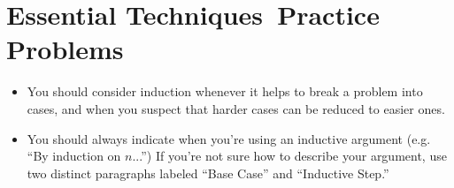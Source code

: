 \documentclass[12pt,a4paper,twoside]{article}
\theoremstyle{remark}
\newcommand{\todaystopic}{Essential Techniques}
\begin{document}
\section*{\todaystopic \ Practice Problems}

\pagestyle{fancy}
\setlength{\headheight}{15.2pt}

\begin{itemize}
\item You should consider induction whenever it helps to break a problem into cases, and when you suspect that harder cases can be reduced to easier ones.
\item You should always indicate when you're using an inductive argument (e.g. ``By induction on $n$...'') If you're not sure how to describe your argument, use two distinct paragraphs labeled ``Base Case'' and ``Inductive Step.''
\end{itemize}
\end{document}

